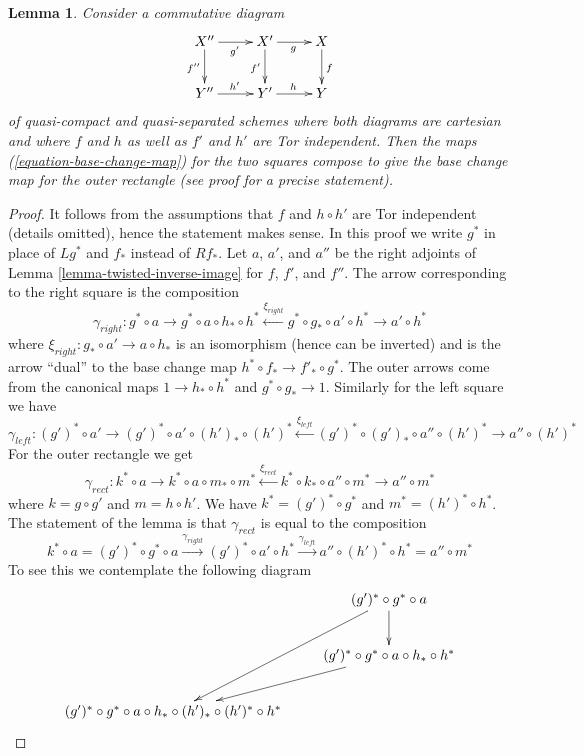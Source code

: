 \documentclass{stacks-project}
\theoremstyle{plain}
\newtheorem{lemma}[subsection]{Lemma}
\theoremstyle{definition}
\theoremstyle{remark}
\numberwithin{equation}{subsection}
\begin{document}
\begin{lemma}
\label{lemma-compose-base-change-maps-horizontal}
Consider a commutative diagram
$$
\xymatrix{
X'' \ar[r]_{g'} \ar[d]_{f''} & X' \ar[r]_g \ar[d]_{f'} & X \ar[d]^f \\
Y'' \ar[r]^{h'} & Y' \ar[r]^h & Y
}
$$
of quasi-compact and quasi-separated schemes where
both diagrams are cartesian and where $f$ and $h$
as well as $f'$ and $h'$ are Tor independent.
Then the maps (\ref{equation-base-change-map})
for the two squares compose to give the base
change map for the outer rectangle (see proof for a precise statement).
\end{lemma}

\begin{proof}
It follows from the assumptions that $f$ and $h \circ h'$ are Tor
independent (details omitted), hence the statement makes sense.
In this proof we write $g^*$ in place of $Lg^*$ and $f_*$ instead
of $Rf_*$. Let $a$, $a'$, and $a''$ be the right adjoints of
Lemma \ref{lemma-twisted-inverse-image}
for $f$, $f'$, and $f''$. The arrow corresponding to the right
square is the composition
$$
\gamma_{right} :
g^* \circ a \to g^* \circ a \circ h_* \circ h^*
\xleftarrow{\xi_{right}} g^* \circ g_* \circ a' \circ h^* \to a' \circ h^*
$$
where $\xi_{right} : g_* \circ a' \to a \circ h_*$
is an isomorphism (hence can be inverted)
and is the arrow ``dual'' to the base change map
$h^* \circ f_* \to f'_* \circ g^*$. The outer arrows come
from the canonical maps $1 \to h_* \circ h^*$ and $g^* \circ g_* \to 1$.
Similarly for the left square we have
$$
\gamma_{left} :
(g')^* \circ a' \to (g')^* \circ a' \circ (h')_* \circ (h')^*
\xleftarrow{\xi_{left}}
(g')^* \circ (g')_* \circ a'' \circ (h')^* \to a'' \circ (h')^*
$$
For the outer rectangle we get
$$
\gamma_{rect} :
k^* \circ a \to
k^* \circ a \circ m_* \circ m^* \xleftarrow{\xi_{rect}}
k^* \circ k_* \circ a'' \circ m^* \to
a'' \circ m^*
$$
where $k = g \circ g'$ and $m = h \circ h'$.
We have $k^* = (g')^* \circ g^*$ and $m^* = (h')^* \circ h^*$.
The statement of the lemma is that $\gamma_{rect}$
is equal to the composition
$$
k^* \circ a =
(g')^* \circ g^* \circ a \xrightarrow{\gamma_{right}}
(g')^* \circ a' \circ h^* \xrightarrow{\gamma_{left}}
a'' \circ (h')^* \circ h^* = a'' \circ m^*
$$
To see this we contemplate the following diagram
$$
\xymatrix{
& (g')^* \circ g^* \circ a \ar[d] \ar[ddl] \\
& (g')^* \circ g^* \circ a \circ h_* \circ h^* \ar[ld] \\
(g')^* \circ g^* \circ a \circ h_* \circ (h')_* \circ (h')^* \circ h^* &
}$$
\end{proof}
\end{document}
